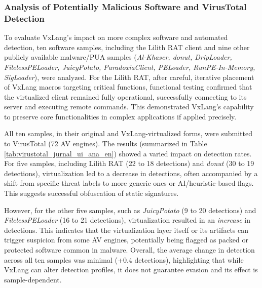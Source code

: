 \subsubsection{Analysis of Potentially Malicious Software and VirusTotal Detection}
To evaluate VxLang's impact on more complex software and automated detection, ten software samples, including the Lilith RAT client \cite{LilithRAT} and nine other publicly available malware/PUA samples (\textit{Al-Khaser, donut, DripLoader, FilelessPELoader, JuicyPotato, ParadoxiaClient, PELoader, RunPE-In-Memory, SigLoader}), were analyzed. For the Lilith RAT, after careful, iterative placement of VxLang macros targeting critical functions, functional testing confirmed that the virtualized client remained fully operational, successfully connecting to its server and executing remote commands. This demonstrated VxLang's capability to preserve core functionalities in complex applications if applied precisely.

All ten samples, in their original and VxLang-virtualized forms, were submitted to VirusTotal (72 AV engines). The results (summarized in Table \ref{tab:virustotal_jurnal_ui_ana_en}) showed a varied impact on detection rates. For five samples, including Lilith RAT (22 to 18 detections) and \textit{donut} (30 to 19 detections), virtualization led to a decrease in detections, often accompanied by a shift from specific threat labels to more generic ones or AI/heuristic-based flags. This suggests successful obfuscation of static signatures.

However, for the other five samples, such as \textit{JuicyPotato} (9 to 20 detections) and \textit{FilelessPELoader} (16 to 21 detections), virtualization resulted in an \textit{increase} in detections. This indicates that the virtualization layer itself or its artifacts can trigger suspicion from some AV engines, potentially being flagged as packed or protected software common in malware. Overall, the average change in detection across all ten samples was minimal (+0.4 detections), highlighting that while VxLang can alter detection profiles, it does not guarantee evasion and its effect is sample-dependent.

